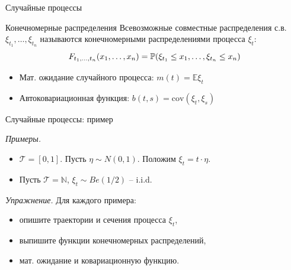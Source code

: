 \documentclass{beamer}
\begin{document}
\begin{frame}{Случайные процессы}
    \begin{block}{Конечномерные распределения}
    Всевозможные совместные распределения с.в. $\xi_{t_1}, \ldots, \xi_{t_n}$ называются конечномерными распределениями процесса $\xi_t$:
    $$
        F_{t_1, \ldots, t_n} (x_1, \ldots, x_n) = \mathbb{P}(\xi_{t_1} \leq x_1, \ldots, \xi_{t_n} \leq x_n)
    $$
\end{block}
\begin{itemize}
    \item Мат. ожидание случайного процесса: $m(t)=\mathbb{E} \xi_t$
    \item Автоковариационная функция: $b(t, s) = \mathrm{cov}(\xi_t, \xi_s)$
\end{itemize}
\end{frame}

\begin{frame}{Случайные процессы: пример}
    
    \textit{Примеры.}
    \begin{itemize}
        \item $\mathcal{T}=[0,1]$. Пусть $\eta \sim N(0,1)$. Положим $\xi_t = t \cdot \eta$. 
        \item Пусть $\mathcal{T}=\mathbb{N}$, $\xi_t \sim Be(1/2)$ -- i.i.d.
    \end{itemize}
    \textit{Упражнение.}
    Для каждого примера: 
    \begin{itemize}
        \item опишите траектории и сечения процесса $\xi_t$,
        \item выпишите функции конечномерных распределений,
        \item мат. ожидание и ковариационную функцию.
    \end{itemize}
\end{frame}
\end{document}
